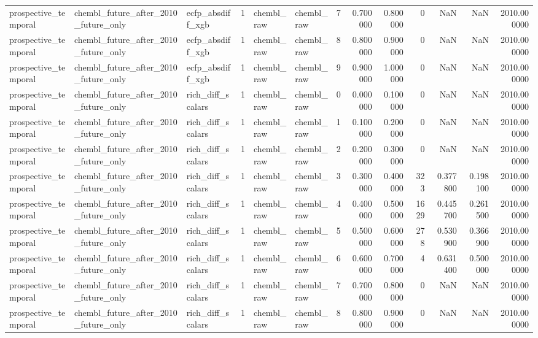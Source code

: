 \begin{longtable}{lllrllrrrrrrr}
prospective\_temporal & chembl\_future\_after\_2010\_future\_only & ecfp\_absdiff\_xgb & 1 & chembl\_raw & chembl\_raw & 7 & 0.700000 & 0.800000 & 0 & NaN & NaN & 2010.000000 \\
prospective\_temporal & chembl\_future\_after\_2010\_future\_only & ecfp\_absdiff\_xgb & 1 & chembl\_raw & chembl\_raw & 8 & 0.800000 & 0.900000 & 0 & NaN & NaN & 2010.000000 \\
prospective\_temporal & chembl\_future\_after\_2010\_future\_only & ecfp\_absdiff\_xgb & 1 & chembl\_raw & chembl\_raw & 9 & 0.900000 & 1.000000 & 0 & NaN & NaN & 2010.000000 \\
prospective\_temporal & chembl\_future\_after\_2010\_future\_only & rich\_diff\_scalars & 1 & chembl\_raw & chembl\_raw & 0 & 0.000000 & 0.100000 & 0 & NaN & NaN & 2010.000000 \\
prospective\_temporal & chembl\_future\_after\_2010\_future\_only & rich\_diff\_scalars & 1 & chembl\_raw & chembl\_raw & 1 & 0.100000 & 0.200000 & 0 & NaN & NaN & 2010.000000 \\
prospective\_temporal & chembl\_future\_after\_2010\_future\_only & rich\_diff\_scalars & 1 & chembl\_raw & chembl\_raw & 2 & 0.200000 & 0.300000 & 0 & NaN & NaN & 2010.000000 \\
prospective\_temporal & chembl\_future\_after\_2010\_future\_only & rich\_diff\_scalars & 1 & chembl\_raw & chembl\_raw & 3 & 0.300000 & 0.400000 & 323 & 0.377800 & 0.198100 & 2010.000000 \\
prospective\_temporal & chembl\_future\_after\_2010\_future\_only & rich\_diff\_scalars & 1 & chembl\_raw & chembl\_raw & 4 & 0.400000 & 0.500000 & 1629 & 0.445700 & 0.261500 & 2010.000000 \\
prospective\_temporal & chembl\_future\_after\_2010\_future\_only & rich\_diff\_scalars & 1 & chembl\_raw & chembl\_raw & 5 & 0.500000 & 0.600000 & 278 & 0.530900 & 0.366900 & 2010.000000 \\
prospective\_temporal & chembl\_future\_after\_2010\_future\_only & rich\_diff\_scalars & 1 & chembl\_raw & chembl\_raw & 6 & 0.600000 & 0.700000 & 4 & 0.631400 & 0.500000 & 2010.000000 \\
prospective\_temporal & chembl\_future\_after\_2010\_future\_only & rich\_diff\_scalars & 1 & chembl\_raw & chembl\_raw & 7 & 0.700000 & 0.800000 & 0 & NaN & NaN & 2010.000000 \\
prospective\_temporal & chembl\_future\_after\_2010\_future\_only & rich\_diff\_scalars & 1 & chembl\_raw & chembl\_raw & 8 & 0.800000 & 0.900000 & 0 & NaN & NaN & 2010.000000 \\

\end{longtable}
